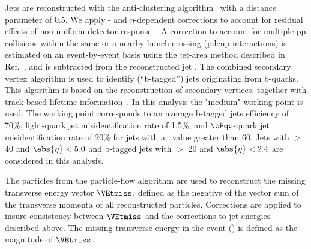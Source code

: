 Jets are reconstructed with the anti-\kt clustering
algorithm~\cite{Cacciari:2008gp} with a distance parameter of 0.5. We apply
\pt- and $\eta$-dependent corrections to account for residual
effects of non-uniform detector response~\cite{Chatrchyan:2011ds}.
A correction to account for multiple pp collisions within the same or a nearby
bunch crossing (pileup interactions) is estimated on an event-by-event basis using the
jet-area method described in Ref.~\cite{Cacciari:2007fd}, and is
subtracted from the reconstructed jet \pt.
The combined secondary vertex algorithm is used to identify (``b-tagged'') jets 
originating from b-quarks.  This algorithm 
 is based on the reconstruction of secondary vertices, together with track-based lifetime information~\cite{Chatrchyan:2012jua}. 
In this analysis the "medium" working point is used. The working point corresponds to an average b-tagged jets efficiency of 70\%, 
light-quark jet misidentification rate of 1.5\%, and $\cPqc$-quark jet misidentification rate of 20\% 
for jets with a \pt\ value greater than 60\GeV.
Jets with  \PT $>$ 40 \GeV and $\abs{\eta} < 5.0$ and b-tagged jets with \PT $>$ 20 \GeV and $\abs{\eta} < 2.4$ are considered in this analysis.


The particles from the particle-flow algorithm are used to reconstruct the missing transverse energy vector $\VEtmiss$, defined as the negative of the vector sum of the transverse momenta of all reconstructed particles.  Corrections are applied to insure consistency between
$\VEtmiss$ and the corrections to jet energies described above.  The missing transverse energy in the event (\MPT) is defined as the magnitude of $\VEtmiss$.



